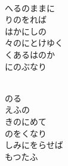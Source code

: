 \documentclass[10pt,b5j]{tarticle} %
\begin{document}
\vspace{1.5em} %
\newcommand{\linespace}{0.5em} %
\newcommand{\blocksize}{0.5\hsize} %
\newcommand{\itemmargin}{3em} %
\begin{enumerate} %
    \setlength{\itemindent}{\itemmargin} %
    \begin{minipage}[c]{\blocksize}
    
        \vspace{\linespace}
        \item~\\
        へるのままに\\
        りのをれば\\
        はかにしの\\
        々のにとけゆく\\
        くあるはのか\\
        にのぶなり
        
    \end{minipage}
    \begin{minipage}[c]{\blocksize}
        
        \vspace{\linespace}
        \item~\\
        のる\\
        えふの\\
        きのにめて\\
        のをくなり\\
        しみにをらせば\\
        もつたふ
        
    \end{minipage}
    \begin{minipage}[c]{\blocksize}
        

\end{minipage}
\end{enumerate}
\end{document}
